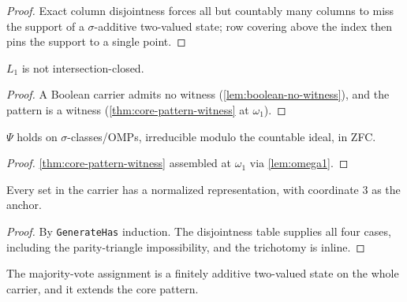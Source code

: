 \begin{proof}
\leanok
Exact column disjointness forces all but countably many columns to miss the support of a $\sigma$-additive two-valued state; row covering above the index then pins the support to a single point.
\end{proof}

\begin{lemma}
\label{lem:carrier-not-boolean}
\leanok
{}
$L_1$ is not intersection-closed.
\end{lemma}

\begin{proof}
\leanok
A Boolean carrier admits no witness (\ref{lem:boolean-no-witness}), and the
pattern is a witness (\ref{thm:core-pattern-witness} at $\omega_1$).
\end{proof}

\begin{theorem}
\label{thm:psi-zfc}
\leanok
{}
$\Psi$ holds on $\sigma$-classes/OMPs, irreducible modulo the countable ideal,
in ZFC.
\end{theorem}

\begin{proof}
\leanok
\ref{thm:core-pattern-witness} assembled at $\omega_1$ via \ref{lem:omega1}.
\end{proof}

\begin{theorem}
\label{thm:normal-form}
\leanok
{}
Every set in the carrier has a normalized representation, with coordinate $3$ as
the anchor.
\end{theorem}

\begin{proof}
\leanok
By \texttt{GenerateHas} induction. The disjointness table supplies all four cases, including the parity-triangle impossibility, and the trichotomy is inline.
\end{proof}

\begin{theorem}
\label{thm:vote-state}
\leanok
{}
The majority-vote assignment is a finitely additive two-valued state on the
whole carrier, and it extends the core pattern.
\end{theorem}

